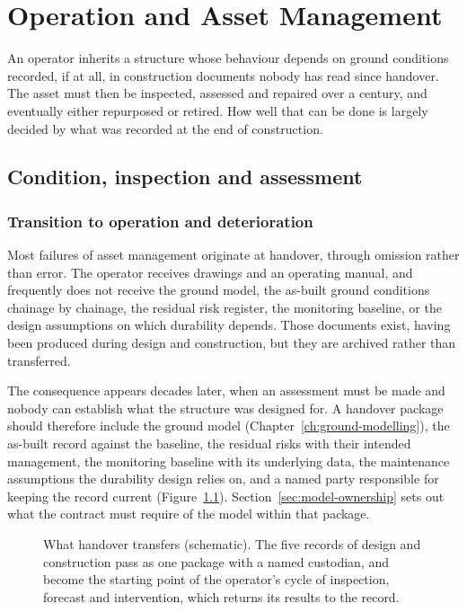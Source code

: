 \chapter{Operation and Asset Management}
\label{ch:assets}

An operator inherits a structure whose behaviour depends on ground conditions recorded, if at all, in construction documents nobody has read since handover. The asset must then be inspected, assessed and repaired over a century, and eventually either repurposed or retired. How well that can be done is largely decided by what was recorded at the end of construction.

\section{Condition, inspection and assessment}
\label{sec:condition-inspection}

\subsection{Transition to operation and deterioration}
\label{sec:transition-deterioration}

Most failures of asset management originate at handover, through omission
rather than error. The operator receives drawings and an operating manual, and
frequently does not receive the ground model, the as-built ground conditions
chainage by chainage, the residual risk register, the monitoring baseline, or
the design assumptions on which durability depends. Those documents exist,
having been produced during design and construction, but they are archived
rather than transferred.

The consequence appears decades later, when an assessment must be made and
nobody can establish what the structure was designed for. A handover package
should therefore include the ground model
(Chapter~\ref{ch:ground-modelling}), the as-built record against the baseline,
the residual risks with their intended management, the monitoring baseline
with its underlying data, the maintenance assumptions the durability design
relies on, and a named party responsible for keeping the record current
(Figure~\ref{fig:handover-record}). Section~\ref{sec:model-ownership}
sets out what the contract must require of the model within that package.

\begin{figure}[htbp]
\centering
{}
\caption{What handover transfers (schematic). The five records of design and construction pass as one package with a named custodian, and become the starting point of the operator's cycle of inspection, forecast and intervention, which returns its results to the record.}
\label{fig:handover-record}
\end{figure}

